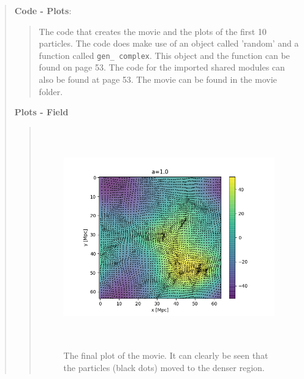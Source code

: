 \begin{quote}
\begin{quote}
\end{quote}
\newpage


\textbf{Code - Plots}:
\begin{quote}

The code that creates the movie and the plots of the first 10 particles. The code does make use of an object called 'random' and a function called \texttt{gen\_ complex}. This object and the function  can be found on page 53. The code for the imported shared modules can also be found at page 53. The movie can be found in the movie folder.

\end{quote}

\newpage

\textbf{Plots - Field}

\begin{quote}
\begin{figure}[!ht]
\centering
\includegraphics[width=14cm, height=9.5cm]{./Plots/4c/4c=89.png}
\caption{The final plot of the movie. It can clearly be seen that the particles (black dots) moved to the denser region. }
\label{FIG:stuff}
\end{figure}
\end{quote}


\end{quote}
